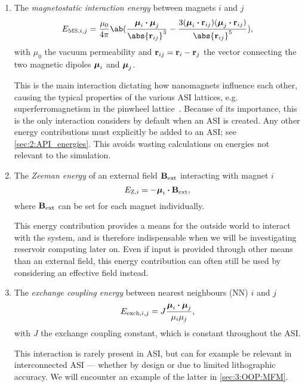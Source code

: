 \begin{enumerate}
	\item The \textit{magnetostatic interaction energy} between magnets $i$ and $j$
	\begin{equation}
		\label{eq:2:E_MS}
		E_{\mathrm{MS},i,j} = \frac{\mu_0}{4 \pi} \ab(\frac{\vc{\mu}_i \bcdot \vc{\mu}_j}{\abs{\vc{r}_{ij}}^3} - \frac{3(\vc{\mu}_i \bcdot \vc{r}_{ij}) (\vc{\mu}_j \bcdot \vc{r}_{ij})}{\abs{\vc{r}_{ij}}^5}) \mathrm{,}
	\end{equation}
	with $\mu_0$ the vacuum permeability and $\boldsymbol{\mathbf{r}}_{ij} = \boldsymbol{\mathbf{r}}_i - \boldsymbol{\mathbf{r}}_j$ the vector connecting the two magnetic dipoles $\boldsymbol{\mathbf{\mu}}_i$ and $\boldsymbol{\mathbf{\mu}}_j$. \par
	This is the main interaction dictating how nanomagnets influence each other, causing the typical properties of the various ASI lattices, e.g. superferromagnetism in the pinwheel lattice~\cite{li2018pinwheel}.
	Because of its importance, this is the only interaction \hotspice considers by default when an ASI is created.
	Any other energy contributions must explicitly be added to an ASI; see \cref{sec:2:API_energies}.
	This avoids wasting calculations on energies not relevant to the simulation.
	
	\item The \textit{Zeeman energy} of an external field $\boldsymbol{\mathbf{B}}_\mathrm{ext}$ interacting with magnet $i$
	\begin{equation}
		\label{eq:2:E_Z}
		E_{\mathrm{Z},i} = -\boldsymbol{\mathbf{\mu}}_i \boldsymbol{\cdot} \boldsymbol{\mathbf{B}}_\mathrm{ext} \mathrm{,}
	\end{equation}
	where $\boldsymbol{\mathbf{B}}_\mathrm{ext}$ can be set for each magnet individually. \par
	This energy contribution provides a means for the outside world to interact with the system, and is therefore indispensable when we will be investigating reservoir computing later on.
	Even if input is provided through other means than an external field, this energy contribution can often still be used by considering an effective field instead.
	
	\item The \textit{exchange coupling energy} between nearest neighbours (NN) $i$ and $j$
	\begin{equation}
		\label{eq:2:E_exch}
		E_{\mathrm{exch},i,j} = J \frac{\boldsymbol{\mathbf{\mu}}_i \boldsymbol{\cdot} \boldsymbol{\mathbf{\mu}}_j}{\mu_i \mu_j} \mathrm{,}
	\end{equation}
	with $J$ the exchange coupling constant, which is constant throughout the ASI. \par
	This interaction is rarely present in ASI, but can for example be relevant in interconnected ASI --- whether by design or due to limited lithographic accuracy.
	We will encounter an example of the latter in \cref{sec:3:OOP:MFM}.
\end{enumerate}

